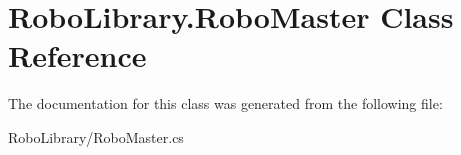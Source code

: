 \hypertarget{class_robo_library_1_1_robo_master}{}\section{Robo\+Library.\+Robo\+Master Class Reference}
\label{class_robo_library_1_1_robo_master}


The documentation for this class was generated from the following file\+:\begin{DoxyCompactItemize}
\item 
Robo\+Library/Robo\+Master.\+cs\end{DoxyCompactItemize}

